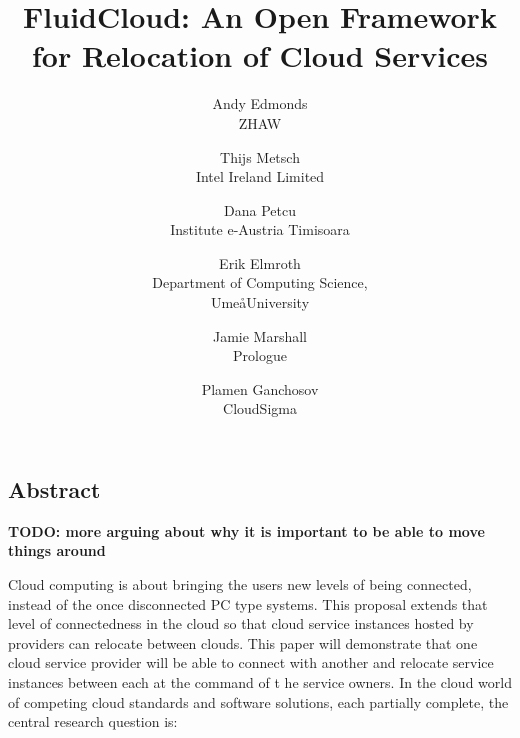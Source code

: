 \documentclass[letterpaper,twocolumn,10pt]{article}
\begin{document}
\date{}

\title{\Large \bf FluidCloud: An Open Framework for Relocation of Cloud Services}

\author{
{\rm Andy Edmonds}\\
ZHAW
\and
{\rm Thijs Metsch}\\
Intel Ireland Limited
\and
{\rm Dana Petcu}\\
Institute e-Austria Timisoara
\and
{\rm Erik Elmroth}\\
Department of Computing Science,\\Ume\aa  University
\and
{\rm Jamie Marshall}\\
Prologue
\and
{\rm Plamen Ganchosov}\\
CloudSigma
}

\maketitle


\subsection*{Abstract}

\textbf{TODO: more arguing about why it is important to be able to move things around}

Cloud computing is about bringing the users new levels of being connected, 
instead of the once disconnected PC type systems. This proposal extends 
that level of connectedness in the cloud so that cloud service instances 
hosted by providers can relocate between clouds. This paper will 
demonstrate that one cloud service provider will be able to connect with 
another and relocate service instances between each at the command of t
he service owners. In the cloud world of competing cloud standards and 
software solutions, each partially complete, the central research question is:
\end{document}
